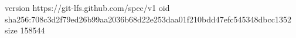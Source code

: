 version https://git-lfs.github.com/spec/v1
oid sha256:708c3d2f79ed26b99aa2036b68d22e253daa01f210bdd47efc545348dbcc1352
size 158544
